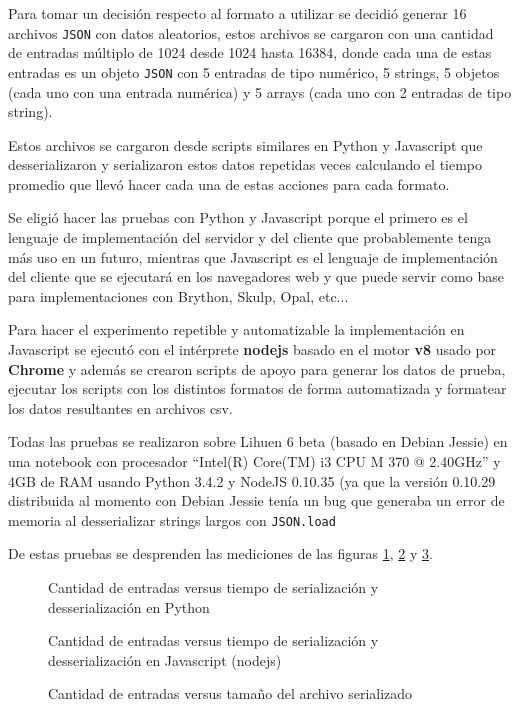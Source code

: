 Para tomar un decisión respecto al formato a utilizar se decidió generar
16 archivos \texttt{JSON} con datos aleatorios, estos archivos se cargaron
con una cantidad de entradas múltiplo de 1024 desde 1024 hasta 16384, donde
cada una de estas entradas es un objeto \texttt{JSON} con 5 entradas de tipo
numérico, 5 strings, 5 objetos (cada uno con una entrada numérica) y 5
arrays (cada uno con 2 entradas de tipo string).

Estos archivos se cargaron desde scripts similares en Python y Javascript que
desserializaron y serializaron estos datos repetidas veces calculando el tiempo
promedio que llevó hacer cada una de estas acciones para cada formato.

Se eligió hacer las pruebas con Python y Javascript porque el primero es el
lenguaje de implementación del servidor y del cliente que probablemente tenga
más uso en un futuro, mientras que Javascript es el lenguaje de implementación
del cliente que se ejecutará en los navegadores web y que puede servir como
base para implementaciones con Brython, Skulp, Opal, etc...

Para hacer el experimento repetible y automatizable la implementación en
Javascript se ejecutó con el intérprete \textbf{nodejs} basado en
el motor \textbf{v8} usado por \textbf{Chrome} y además se crearon
scripts de apoyo para generar los datos de prueba, ejecutar los scripts
con los distintos formatos de forma automatizada y formatear los datos
resultantes en archivos csv.

Todas las pruebas se realizaron sobre Lihuen 6 beta (basado en Debian Jessie)
en una notebook con procesador ``Intel(R) Core(TM) i3 CPU M 370 @ 2.40GHz''
y 4GB de RAM %
usando Python 3.4.2 y NodeJS 0.10.35 (ya que la versión 0.10.29 distribuida al
momento con Debian Jessie tenía un bug que generaba un error de memoria al
desserializar strings largos con \texttt{JSON.load}~%

De estas pruebas se desprenden las mediciones de las figuras%
\ref{fig:ser-time-py}, \ref{fig:ser-time-js} y \ref{fig:ser-size}.

\begin{figure}
    \caption{Cantidad de entradas versus tiempo de serialización y desserialización en Python}
    \label{fig:ser-time-py}
\end{figure}

\begin{figure}
    \caption{Cantidad de entradas versus tiempo de serialización y desserialización en Javascript (nodejs)}
    \label{fig:ser-time-js}
\end{figure}

\begin{figure}
    \caption{Cantidad de entradas versus tamaño del archivo serializado}
    \label{fig:ser-size}
\end{figure}


